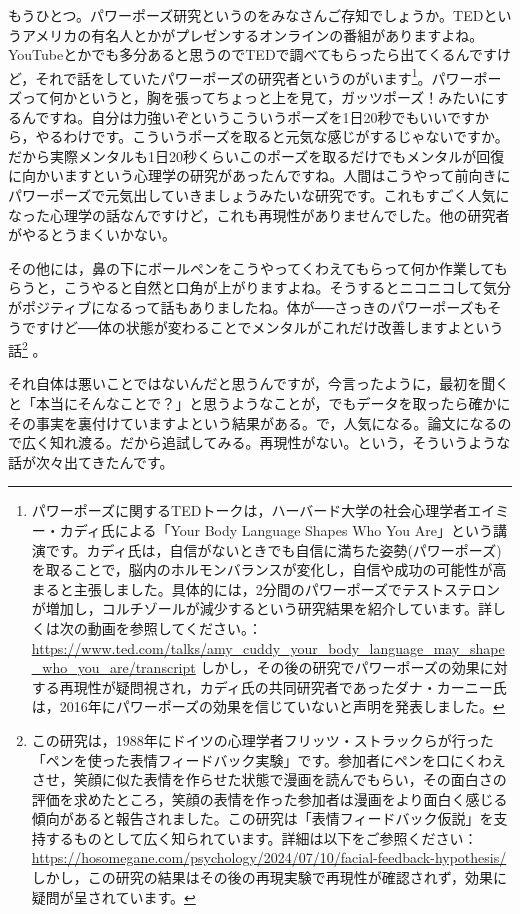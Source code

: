 \documentclass{ltjsbook}
\begin{document}
もうひとつ。パワーポーズ研究というのをみなさんご存知でしょうか。TEDというアメリカの有名人とかがプレゼンするオンラインの番組がありますよね。YouTubeとかでも多分あると思うのでTEDで調べてもらったら出てくるんですけど，それで話をしていたパワーポーズの研究者というのがいます\footnote{パワーポーズに関するTEDトークは，ハーバード大学の社会心理学者エイミー・カディ氏による「Your Body Language Shapes Who You Are」という講演です。カディ氏は，自信がないときでも自信に満ちた姿勢(パワーポーズ)を取ることで，脳内のホルモンバランスが変化し，自信や成功の可能性が高まると主張しました。具体的には，2分間のパワーポーズでテストステロンが増加し，コルチゾールが減少するという研究結果を紹介しています。詳しくは次の動画を参照してください。：\url{https://www.ted.com/talks/amy_cuddy_your_body_language_may_shape_who_you_are/transcript} しかし，その後の研究でパワーポーズの効果に対する再現性が疑問視され，カディ氏の共同研究者であったダナ・カーニー氏は，2016年にパワーポーズの効果を信じていないと声明を発表しました。}。パワーポーズって何かというと，胸を張ってちょっと上を見て，ガッツポーズ！みたいにするんですね。自分は力強いぞというこういうポーズを1日20秒でもいいですから，やるわけです。こういうポーズを取ると元気な感じがするじゃないですか。だから実際メンタルも1日20秒くらいこのポーズを取るだけでもメンタルが回復に向かいますという心理学の研究があったんですね。人間はこうやって前向きにパワーポーズで元気出していきましょうみたいな研究です。これもすごく人気になった心理学の話なんですけど，これも再現性がありませんでした。他の研究者がやるとうまくいかない。

その他には，鼻の下にボールペンをこうやってくわえてもらって何か作業してもらうと，こうやると自然と口角が上がりますよね。そうするとニコニコして気分がポジティブになるって話もありましたね。体が──さっきのパワーポーズもそうですけど──体の状態が変わることでメンタルがこれだけ改善しますよという話\footnote{この研究は，1988年にドイツの心理学者フリッツ・ストラックらが行った「ペンを使った表情フィードバック実験」です。参加者にペンを口にくわえさせ，笑顔に似た表情を作らせた状態で漫画を読んでもらい，その面白さの評価を求めたところ，笑顔の表情を作った参加者は漫画をより面白く感じる傾向があると報告されました。この研究は「表情フィードバック仮説」を支持するものとして広く知られています。詳細は以下をご参照ください：\url{https://hosomegane.com/psychology/2024/07/10/facial-feedback-hypothesis/}しかし，この研究の結果はその後の再現実験で再現性が確認されず，効果に疑問が呈されています。} 。

それ自体は悪いことではないんだと思うんですが，今言ったように，最初を聞くと「本当にそんなことで？」と思うようなことが，でもデータを取ったら確かにその事実を裏付けていますよという結果がある。で，人気になる。論文になるので広く知れ渡る。だから追試してみる。再現性がない。という，そういうような話が次々出てきたんです。
\end{document}

